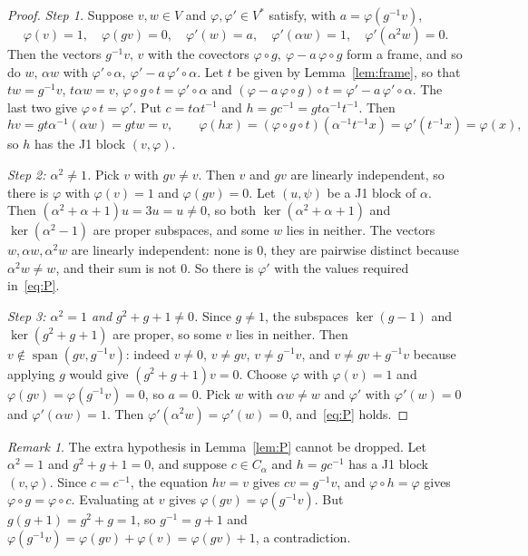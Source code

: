 \documentclass[11pt]{amsart}
\theoremstyle{definition}
\theoremstyle{remark}
\newtheorem{remark}[theorem]{Remark}
\newcommand{\Span}{\operatorname{span}}
\begin{document}
\begin{proof}
\emph{Step 1.} Suppose $v,w\in V$ and $\varphi,\varphi'\in V^*$ satisfy, with
$a=\varphi(g^{-1}v)$,
\begin{equation}\label{eq:P}
\varphi(v)=1,\quad \varphi(gv)=0,\quad \varphi'(w)=a,\quad \varphi'(\alpha w)=1,\quad
\varphi'(\alpha^2w)=0.
\end{equation}
Then the vectors $g^{-1}v,\,v$ with the covectors $\varphi\circ g,\ \varphi-a\,\varphi\circ g$ form a
frame, and so do $w,\,\alpha w$ with $\varphi'\circ\alpha,\ \varphi'-a\,\varphi'\circ\alpha$. Let $t$
be given by Lemma~\ref{lem:frame}, so that $tw=g^{-1}v$, $t\alpha w=v$,
$\varphi\circ g\circ t=\varphi'\circ\alpha$ and
$(\varphi-a\,\varphi\circ g)\circ t=\varphi'-a\,\varphi'\circ\alpha$. The last two give
$\varphi\circ t=\varphi'$. Put $c=t\alpha t^{-1}$ and $h=gc^{-1}=gt\alpha^{-1}t^{-1}$. Then
\[
hv=gt\alpha^{-1}(\alpha w)=gtw=v,\qquad
\varphi(hx)=(\varphi\circ g\circ t)(\alpha^{-1}t^{-1}x)=\varphi'(t^{-1}x)=\varphi(x),
\]
so $h$ has the J1 block $(v,\varphi)$.

\emph{Step 2: $\alpha^2\ne1$.} Pick $v$ with $gv\ne v$. Then $v$ and $gv$ are linearly independent,
so there is $\varphi$ with $\varphi(v)=1$ and $\varphi(gv)=0$. Let $(u,\psi)$ be a J1 block of
$\alpha$. Then $(\alpha^2+\alpha+1)u=3u=u\ne0$, so both $\ker(\alpha^2+\alpha+1)$ and
$\ker(\alpha^2-1)$ are proper subspaces, and some $w$ lies in neither. The vectors
$w,\alpha w,\alpha^2w$ are linearly independent: none is $0$, they are pairwise distinct because
$\alpha^2w\ne w$, and their sum is not $0$. So there is $\varphi'$ with the values required
in~\eqref{eq:P}.

\emph{Step 3: $\alpha^2=1$ and $g^2+g+1\ne0$.} Since $g\ne1$, the subspaces $\ker(g-1)$ and
$\ker(g^2+g+1)$ are proper, so some $v$ lies in neither. Then $v\notin\Span(gv,g^{-1}v)$: indeed
$v\ne0$, $v\ne gv$, $v\ne g^{-1}v$, and $v\ne gv+g^{-1}v$ because applying $g$ would give
$(g^2+g+1)v=0$. Choose $\varphi$ with $\varphi(v)=1$ and $\varphi(gv)=\varphi(g^{-1}v)=0$, so
$a=0$. Pick $w$ with $\alpha w\ne w$ and $\varphi'$ with $\varphi'(w)=0$ and
$\varphi'(\alpha w)=1$. Then $\varphi'(\alpha^2w)=\varphi'(w)=0$, and~\eqref{eq:P} holds.
\end{proof}

\begin{remark}\label{rem:sharpP}
The extra hypothesis in Lemma~\ref{lem:P} cannot be dropped. Let $\alpha^2=1$ and
$g^2+g+1=0$, and suppose $c\in C_\alpha$ and $h=gc^{-1}$ has a J1 block $(v,\varphi)$. Since
$c=c^{-1}$, the equation $hv=v$ gives $cv=g^{-1}v$, and $\varphi\circ h=\varphi$ gives
$\varphi\circ g=\varphi\circ c$. Evaluating at $v$ gives $\varphi(gv)=\varphi(g^{-1}v)$. But
$g(g+1)=g^2+g=1$, so $g^{-1}=g+1$ and $\varphi(g^{-1}v)=\varphi(gv)+\varphi(v)=\varphi(gv)+1$, a
contradiction.
\end{remark}
\end{document}
